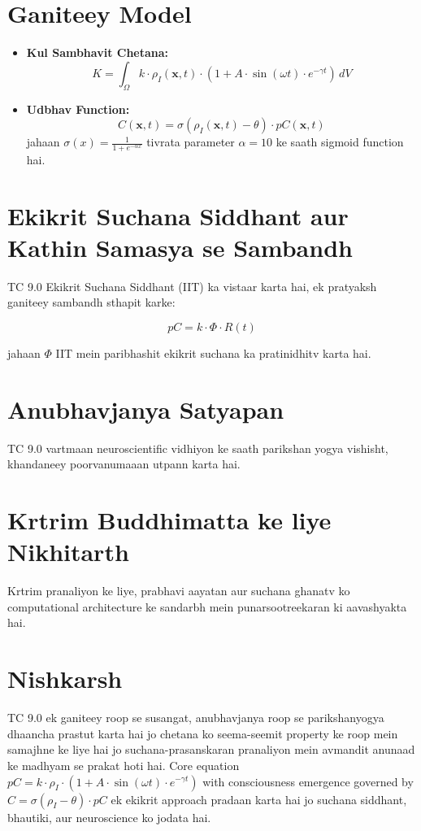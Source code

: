 \documentclass[12pt]{article}
\begin{document}
\section{Ganiteey Model}
\begin{itemize}
    \item \textbf{Kul Sambhavit Chetana:} 
    \begin{equation}
    K = \int_{\Omega} k \cdot \rho_I(\mathbf{x}, t) \cdot \left(1 + A \cdot \sin(\omega t) \cdot e^{-\gamma t}\right) \, dV
    \end{equation}
    
    \item \textbf{Udbhav Function:} 
    \begin{equation}
    C(\mathbf{x}, t) = \sigma(\rho_I(\mathbf{x}, t) - \theta) \cdot pC(\mathbf{x}, t)
    \end{equation}
    jahaan $\sigma(x) = \frac{1}{1 + e^{-\alpha x}}$ tivrata parameter $\alpha = 10$ ke saath sigmoid function hai.
\end{itemize}

\section{Ekikrit Suchana Siddhant aur Kathin Samasya se Sambandh}

TC 9.0 Ekikrit Suchana Siddhant (IIT) ka vistaar karta hai, ek pratyaksh ganiteey sambandh sthapit karke:

\begin{equation}
pC = k \cdot \Phi \cdot R(t)
\end{equation}

jahaan $\Phi$ IIT mein paribhashit ekikrit suchana ka pratinidhitv karta hai.

\section{Anubhavjanya Satyapan}
TC 9.0 vartmaan neuroscientific vidhiyon ke saath parikshan yogya vishisht, khandaneey poorvanumaaan utpann karta hai.

\section{Krtrim Buddhimatta ke liye Nikhitarth}

Krtrim pranaliyon ke liye, prabhavi aayatan aur suchana ghanatv ko computational architecture ke sandarbh mein punarsootreekaran ki aavashyakta hai.

\section{Nishkarsh}
TC 9.0 ek ganiteey roop se susangat, anubhavjanya roop se parikshanyogya dhaancha prastut karta hai jo chetana ko seema-seemit property ke roop mein samajhne ke liye hai jo suchana-prasanskaran pranaliyon mein avmandit anunaad ke madhyam se prakat hoti hai. Core equation $pC = k \cdot \rho_I \cdot (1 + A \cdot \sin(\omega t) \cdot e^{-\gamma t})$ with consciousness emergence governed by $C = \sigma(\rho_I - \theta) \cdot pC$ ek ekikrit approach pradaan karta hai jo suchana siddhant, bhautiki, aur neuroscience ko jodata hai.
\end{document}
